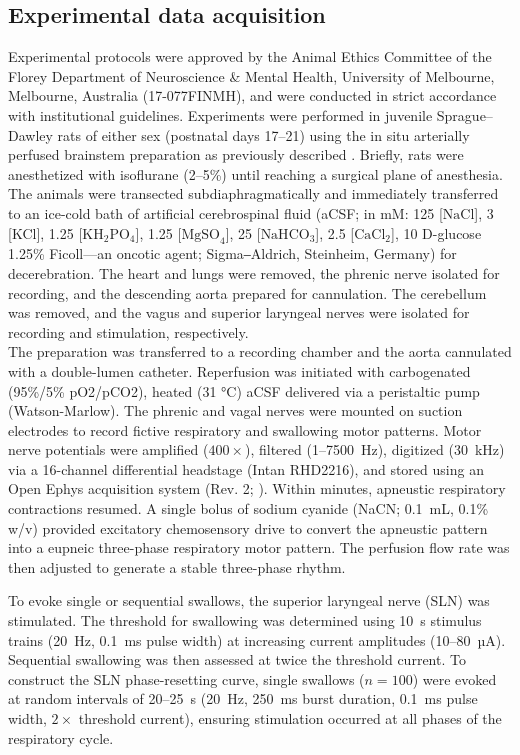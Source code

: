 \documentclass[pdflatex,sn-mathphys-ay]{sn-jnl}%
\theoremstyle{thmstyleone}%
\theoremstyle{thmstyletwo}%
\theoremstyle{thmstylethree}%
\begin{document}
\subsection{Experimental data acquisition}
Experimental protocols were approved by the Animal Ethics Committee of the Florey Department of Neuroscience \& Mental Health, University of Melbourne, Melbourne, Australia (17-077FINMH), and were conducted in strict accordance with institutional guidelines. 
Experiments were performed in juvenile Sprague–Dawley rats of either sex (postnatal days 17–21) using the in situ arterially perfused brainstem preparation as previously described \citep{paton1996working, dutschmann2000respiratory}. Briefly, rats were anesthetized with isoflurane (2–5\%) until reaching a surgical plane of anesthesia. The animals were transected subdiaphragmatically and immediately transferred to an ice-cold bath of artificial cerebrospinal fluid (aCSF; in mM: 125 [$\text{NaCl}$], 3 [KCl], 1.25 [$\text{KH}_2\text{PO}_4$], 1.25 [$\text{MgSO}_4$], 25 [$\text{NaH}\text{CO}_3$], 2.5 [$\text{CaCl}_2$], 10  D-glucose 1.25\% Ficoll---an oncotic agent; Sigma‒Aldrich, Steinheim, Germany) for decerebration. The heart and lungs were removed, the phrenic nerve isolated for recording, and the descending aorta prepared for cannulation. The cerebellum was removed, and the vagus and superior laryngeal nerves were isolated for recording and stimulation, respectively. \\
The preparation was transferred to a recording chamber and the aorta cannulated with a double-lumen catheter. Reperfusion was initiated with carbogenated (95\%/5\% pO2/pCO2), heated (31 °C) aCSF delivered via a peristaltic pump (Watson-Marlow). The phrenic and vagal nerves were mounted on suction electrodes to record fictive respiratory and swallowing motor patterns. Motor nerve potentials were amplified ($400\times$), filtered (1–7500~Hz), digitized (30~kHz) via a 16-channel differential headstage (Intan RHD2216), and stored using an Open Ephys acquisition system (Rev. 2; \citet{siegle2017open}). Within minutes, apneustic respiratory contractions resumed. A single bolus of sodium cyanide (NaCN; 0.1~mL, 0.1\% w/v) provided excitatory chemosensory drive to convert the apneustic pattern into a eupneic three-phase respiratory motor pattern. The perfusion flow rate was then adjusted to generate a stable three-phase rhythm.

To evoke single or sequential swallows, the superior laryngeal nerve (SLN) was stimulated. The threshold for swallowing was determined using 10~s stimulus trains (20~Hz, 0.1~ms pulse width) at increasing current amplitudes (10–80~µA). Sequential swallowing was then assessed at twice the threshold current.
To construct the SLN phase-resetting curve, single swallows ($n = 100$) were evoked at random intervals of 20–25~s (20~Hz, 250~ms burst duration, 0.1~ms pulse width, $2\times$ threshold current), ensuring stimulation occurred at all phases of the respiratory cycle.
\end{document}

